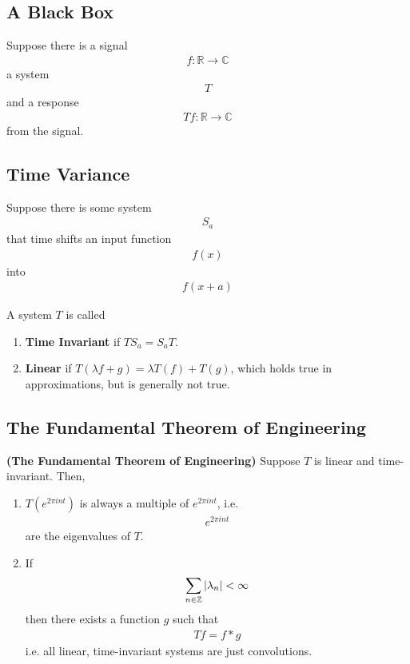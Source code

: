 \subsection{A Black Box}
Suppose there is a signal
\begin{align}
    f: \mathbb{R} \to \mathbb{C}
\end{align}
a system
\begin{align}
    T
\end{align}
and a response
\begin{align}
    Tf: \mathbb{R} \to \mathbb{C}
\end{align}
from the signal.
\subsection{Time Variance}
Suppose there is some system
\begin{align}
    S_a
\end{align}
that time shifts an input function
\begin{align}
    f(x)
\end{align}
into
\begin{align}
    f(x + a)
\end{align}
\begin{definition}
    A system $T$ is called
    \begin{enumerate}
        \item \textbf{Time Invariant} if $TS_a = S_aT$.
        \item \textbf{Linear} if $T(\lambda f+g) = \lambda T(f) + T(g)$, which holds true in approximations, but is generally not true.
    \end{enumerate}
\end{definition}
\subsection{The Fundamental Theorem of Engineering}
\begin{theorem}
    \textbf{(The Fundamental Theorem of Engineering)} Suppose $T$ is linear and time-invariant. Then,
    \begin{enumerate}
        \item $T \left( e^{2\pi in t} \right)$ is always a multiple of $e^{2\pi in t}$, i.e.
        \begin{align}
            e^{2\pi in t}
        \end{align}
        are the eigenvalues of $T$.
        \item If
        \begin{align}
            \sum_{n \in \mathbb{Z}} \abs{\lambda_n} < \infty
        \end{align}
        then there exists a function $g$ such that
        \begin{align}
            Tf = f * g
        \end{align}
        i.e. all linear, time-invariant systems are just convolutions.
    \end{enumerate}
\end{theorem}
